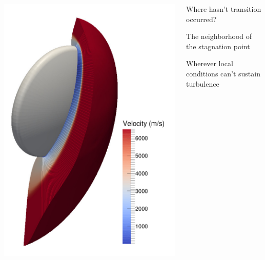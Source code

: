 \documentclass[mathserif]{beamer}
\begin{document}
\begin{frame}{}
\begin{columns}
  \begin{column}{0.30\textwidth}
    \includegraphics[width=\textwidth]{symplanenorm}
  \end{column}
  \begin{column}{0.75\textwidth}
  \begin{description}[<+->][Q]
    \item[Q] Where hasn't transition occurred?
    \item[A] The neighborhood of the stagnation point
    \item[A] Wherever local conditions can't sustain turbulence
        \medskip
        \begin{enumerate}[<+->]

\end{enumerate}
\end{description}
\end{column}
\end{columns}
\end{frame}
\end{document}
